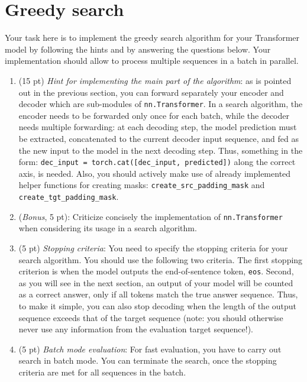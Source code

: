 \documentclass[a4paper,11pt]{article}
\begin{document}
\section{Greedy search}
Your task here is to implement the greedy search algorithm for your Transformer model
by following the hints and by answering the questions below.
Your implementation should allow to process multiple sequences in a batch in parallel.
\begin{enumerate}
\item (15 pt) \textit{Hint for implementing the main part of the algorithm}: as is pointed out in the previous section, you can forward separately your encoder and decoder which are sub-modules of \texttt{nn.Transformer}.
In a search algorithm, the encoder needs to be forwarded only once for each batch, while the decoder
needs multiple forwarding: at each decoding step, the model prediction must be extracted,
concatenated to the current decoder input sequence, and fed as the new input to the model in the next decoding step.
Thus, something in the form:
\texttt{dec\_input = torch.cat([dec\_input, predicted])} along the correct axis, is needed.
Also, you should actively make use of already implemented helper functions for creating masks:
\texttt{create\_src\_padding\_mask} and \texttt{create\_tgt\_padding\_mask}.

\item (\textit{Bonus}, 5 pt): Criticize concisely the implementation of \texttt{nn.Transformer} when considering
its usage in a search algorithm.
\item (5 pt) \textit{Stopping criteria}: You need to specify the stopping criteria for your search algorithm.
You should use the following two criteria.
The first stopping criterion is when the model outputs
the end-of-sentence token, \texttt{eos}.
Second, as you will see in the next section, an output of your model will be counted as a correct answer,
only if all tokens match the true answer sequence.
Thus, to make it simple, you can also stop decoding when the length of the output sequence exceeds that
of the target sequence (note: you should otherwise never use any information from the evaluation target sequence!).
\item (5 pt) \textit{Batch mode evaluation}: For fast evaluation, you have to carry out search in batch mode.
You can terminate the search, once the stopping criteria are met for all sequences in the batch.
\end{enumerate}
\end{document}

